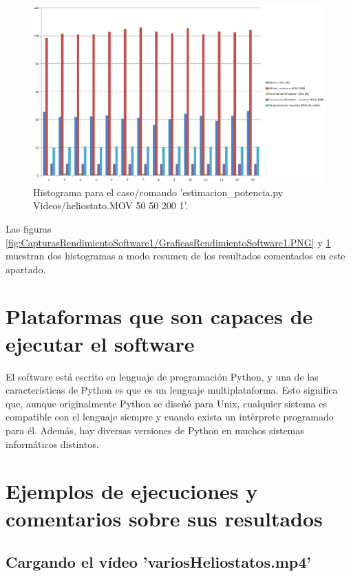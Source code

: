 \begin{figure}[h!]
  	\centering
	\includegraphics[width=\textwidth]{CapturasRendimientoSoftware2/GraficasRendimientoSoftware2.PNG}
	\caption{Histograma para el caso/comando 'estimacion\_potencia.py Videos/heliostato.MOV 50 50 200 1'.
	\label{fig:CapturasRendimientoSoftware2/GraficasRendimientoSoftware2.PNG}}
\end{figure}

Las figuras \ref{fig:CapturasRendimientoSoftware1/GraficasRendimientoSoftware1.PNG} y \ref{fig:CapturasRendimientoSoftware2/GraficasRendimientoSoftware2.PNG} muestran dos histogramas a modo resumen de los resultados comentados en este apartado.

\section{Plataformas que son capaces de ejecutar el software}

El software está escrito en lenguaje de programación Python, y una de las características de Python es que es un lenguaje multiplataforma. Esto significa que, aunque originalmente Python se diseñó para Unix, cualquier sistema es compatible con el lenguaje siempre y cuando exista un intérprete programado para él. Además, hay diversas versiones de Python en muchos sistemas informáticos distintos.

\section{Ejemplos de ejecuciones y comentarios sobre sus resultados}

\subsection{Cargando el vídeo 'variosHeliostatos.mp4'}

